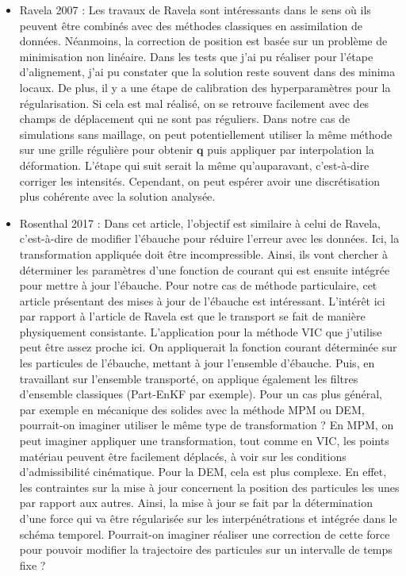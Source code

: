 \documentclass{article}
\begin{document}
\begin{itemize}
    \item Ravela 2007 \cite{ravela_data_2007} : Les travaux de Ravela sont intéressants dans le sens où ils peuvent être combinés avec des méthodes classiques en assimilation de données. Néanmoins, la correction de position est basée sur un problème de minimisation non linéaire. Dans les tests que j'ai pu réaliser pour l'étape d'alignement, j'ai pu constater que la solution reste souvent dans des minima locaux. De plus, il y a une étape de calibration des hyperparamètres pour la régularisation. Si cela est mal réalisé, on se retrouve facilement avec des champs de déplacement qui ne sont pas réguliers. Dans notre cas de simulations sans maillage, on peut potentiellement utiliser la même méthode sur une grille régulière pour obtenir $\mathbf{q}$ puis appliquer par interpolation la déformation. L'étape qui suit serait la même qu'auparavant, c'est-à-dire corriger les intensités. Cependant, on peut espérer avoir une discrétisation plus cohérente avec la solution analysée.
    \item Rosenthal 2017 \cite{rosenthal_displacement_2017} : Dans cet article, l'objectif est similaire à celui de Ravela, c'est-à-dire de modifier l'ébauche pour réduire l'erreur avec les données. Ici, la transformation appliquée doit être incompressible. Ainsi, ils vont chercher à déterminer les paramètres d'une fonction de courant qui est ensuite intégrée pour mettre à jour l'ébauche. Pour notre cas de méthode particulaire, cet article présentant des mises à jour de l'ébauche est intéressant. L'intérêt ici par rapport à l'article de Ravela est que le transport se fait de manière physiquement consistante. L'application pour la méthode VIC que j'utilise peut être assez proche ici. On appliquerait la fonction courant déterminée sur les particules de l'ébauche, mettant à jour l'ensemble d'ébauche. Puis, en travaillant sur l'ensemble transporté, on applique également les filtres d'ensemble classiques (Part-EnKF par exemple). Pour un cas plus général, par exemple en mécanique des solides avec la méthode MPM ou DEM, pourrait-on imaginer utiliser le même type de transformation ? En MPM, on peut imaginer appliquer une transformation, tout comme en VIC, les points matériau peuvent être facilement déplacés, à voir sur les conditions d'admissibilité cinématique. Pour la DEM, cela est plus complexe. En effet, les contraintes sur la mise à jour concernent la position des particules les unes par rapport aux autres. Ainsi, la mise à jour se fait par la détermination d'une force qui va être régularisée sur les interpénétrations et intégrée dans le schéma temporel. Pourrait-on imaginer réaliser une correction de cette force pour pouvoir modifier la trajectoire des particules sur un intervalle de temps fixe ?

\end{itemize}
\end{document}
